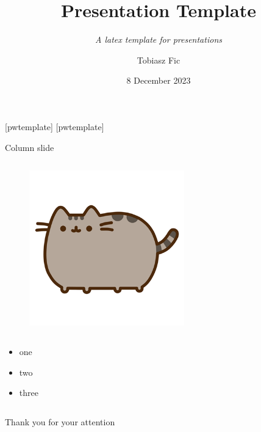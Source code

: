 

\title{Presentation Template}
    \subtitle{\textit{A latex template for presentations}}
\author[T. Fic]{Tobiasz Fic}
\date{8 December 2023}



\begin{frame}
    \maketitle
\end{frame}

[pwtemplate]
[pwtemplate]

\begin{columnframe}{Column slide}
    \begin{column}{0.5\textwidth}
        \begin{figure}
            \centering
            \includegraphics[width=0.6\textwidth, frame]{images/pusheen.png}
        \end{figure}
    \end{column}
    \begin{column}{0.5\textwidth}
        \begin{itemize}
            \item one
            \item two
            \item three
        \end{itemize}
    \end{column}
\end{columnframe}

\begin{frame}{}
    \centering
    \Large{Thank you for your attention}
\end{frame}

